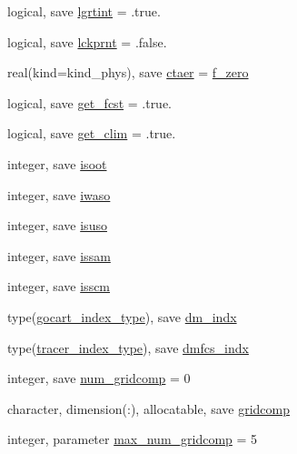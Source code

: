 \begin{DoxyCompactItemize}
\item 
logical, save \hyperlink{namespacemodule__radiation__aerosols_aa27bf6912bfd67b78381892d4f555c51}{lgrtint} = .true.
\item 
logical, save \hyperlink{namespacemodule__radiation__aerosols_a018d5414597049069c1ddd1094285371}{lckprnt} = .false.
\item 
real(kind=kind\+\_\+phys), save \hyperlink{namespacemodule__radiation__aerosols_a4b0aa142aee31c40361dadc390ccc68e}{ctaer} = \hyperlink{namespacemodule__radiation__aerosols_a7db1adcf476a9a5532230aa11fcc3bb7}{f\+\_\+zero}
\item 
logical, save \hyperlink{namespacemodule__radiation__aerosols_a36f851e49de5e1f7da38da5fa6ea445c}{get\+\_\+fcst} = .true.
\item 
logical, save \hyperlink{namespacemodule__radiation__aerosols_a7fe1943010fe47c9d86ef4c993848459}{get\+\_\+clim} = .true.
\item 
integer, save \hyperlink{namespacemodule__radiation__aerosols_aa9aa876f65d1e1e971607bff4ffbddad}{isoot}
\item 
integer, save \hyperlink{namespacemodule__radiation__aerosols_ad15292f4a185c28ad44687d95ef4d3a4}{iwaso}
\item 
integer, save \hyperlink{namespacemodule__radiation__aerosols_acddb4dccea82201fd3b193c15c85ec78}{isuso}
\item 
integer, save \hyperlink{namespacemodule__radiation__aerosols_ab64435256571a80bbb577fc4f27b39ee}{issam}
\item 
integer, save \hyperlink{namespacemodule__radiation__aerosols_a762cff73e22fefab8adf68d08d5c4df1}{isscm}
\item 
type(\hyperlink{structmodule__radiation__aerosols_1_1gocart__index__type}{gocart\+\_\+index\+\_\+type}), save \hyperlink{namespacemodule__radiation__aerosols_a70c58693c0aac6e4dbb6cf425fb0ce6a}{dm\+\_\+indx}
\item 
type(\hyperlink{structmodule__radiation__aerosols_1_1tracer__index__type}{tracer\+\_\+index\+\_\+type}), save \hyperlink{namespacemodule__radiation__aerosols_ad6c4782fbaae13df20891197b67568ec}{dmfcs\+\_\+indx}
\item 
integer, save \hyperlink{namespacemodule__radiation__aerosols_a6ddeb7b34ad2d6ab1575be3520e85891}{num\+\_\+gridcomp} = 0
\item 
character, dimension(\+:), allocatable, save \hyperlink{namespacemodule__radiation__aerosols_a48c2c6c9c509f5c37fea5d788040ad7a}{gridcomp}
\item 
integer, parameter \hyperlink{namespacemodule__radiation__aerosols_ad1187b5d87889c68cbe5929e20e83ac7}{max\+\_\+num\+\_\+gridcomp} = 5

\end{DoxyCompactItemize}
